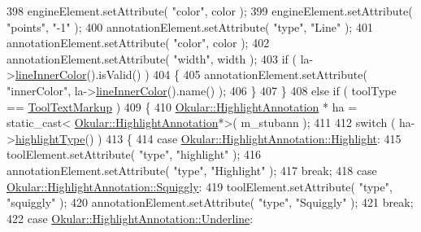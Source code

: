 \begin{DoxyCode}
398         engineElement.setAttribute( \textcolor{stringliteral}{"color"}, color );
399         engineElement.setAttribute( \textcolor{stringliteral}{"points"}, \textcolor{stringliteral}{"-1"} );
400         annotationElement.setAttribute( \textcolor{stringliteral}{"type"}, \textcolor{stringliteral}{"Line"} );
401         annotationElement.setAttribute( \textcolor{stringliteral}{"color"}, color );
402         annotationElement.setAttribute( \textcolor{stringliteral}{"width"}, width );
403         \textcolor{keywordflow}{if} ( la->\hyperlink{classOkular_1_1LineAnnotation_a240bcd7154afdf61c526295134abdc0f}{lineInnerColor}().isValid() )
404         \{
405             annotationElement.setAttribute( \textcolor{stringliteral}{"innerColor"}, la->\hyperlink{classOkular_1_1LineAnnotation_a240bcd7154afdf61c526295134abdc0f}{lineInnerColor}().name() );
406         \}
407     \}
408     \textcolor{keywordflow}{else} \textcolor{keywordflow}{if} ( toolType == \hyperlink{classEditAnnotToolDialog_ae4572c0cf4fc351cf03e4d86ef595a9ca1f78ead80c77ac8dba06e80f011959c3}{ToolTextMarkup} )
409     \{
410         \hyperlink{classOkular_1_1HighlightAnnotation}{Okular::HighlightAnnotation} * ha = \textcolor{keyword}{static\_cast<}
      \hyperlink{classOkular_1_1HighlightAnnotation}{Okular::HighlightAnnotation}*\textcolor{keyword}{>}( m\_stubann );
411 
412         \textcolor{keywordflow}{switch} ( ha->\hyperlink{classOkular_1_1HighlightAnnotation_a3e95972aebea730877a033f8b2908b90}{highlightType}() )
413         \{
414             \textcolor{keywordflow}{case} \hyperlink{classOkular_1_1HighlightAnnotation_a63d2488735d1d6320e2e118743243999a250833fcd89a56dd46955dc287e1a3af}{Okular::HighlightAnnotation::Highlight}:
415                 toolElement.setAttribute( \textcolor{stringliteral}{"type"}, \textcolor{stringliteral}{"highlight"} );
416                 annotationElement.setAttribute( \textcolor{stringliteral}{"type"}, \textcolor{stringliteral}{"Highlight"} );
417                 \textcolor{keywordflow}{break};
418             \textcolor{keywordflow}{case} \hyperlink{classOkular_1_1HighlightAnnotation_a63d2488735d1d6320e2e118743243999ad02aabccfaaea6082d9402b01e6ae9b8}{Okular::HighlightAnnotation::Squiggly}:
419                 toolElement.setAttribute( \textcolor{stringliteral}{"type"}, \textcolor{stringliteral}{"squiggly"} );
420                 annotationElement.setAttribute( \textcolor{stringliteral}{"type"}, \textcolor{stringliteral}{"Squiggly"} );
421                 \textcolor{keywordflow}{break};
422             \textcolor{keywordflow}{case} \hyperlink{classOkular_1_1HighlightAnnotation_a63d2488735d1d6320e2e118743243999a1cb762e7ebfd92add9d8b71106e3fa2c}{Okular::HighlightAnnotation::Underline}:

\end{DoxyCode}
